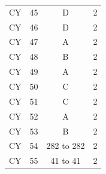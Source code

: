 \documentclass[a4paper,10pt]{exam}
\theoremstyle{remark}
\begin{document}
\begin{enumerate}
\begin{minipage}{0.49\textwidth}
\begin{tabular}{|c|c|c|c|}
CY & 45 & D & 2 \\
CY & 46 & D & 2 \\
CY & 47 & A & 2 \\
CY & 48 & B & 2 \\
CY & 49 & A & 2 \\
CY & 50 & C & 2 \\
CY & 51 & C & 2 \\
CY & 52 & A & 2 \\
CY & 53 & B & 2 \\
CY & 54 & 282 to 282 & 2 \\
CY & 55 & 41 to 41 & 2 \\
\hline
\end{tabular}
\end{minipage}


\end{enumerate}
\end{document}
